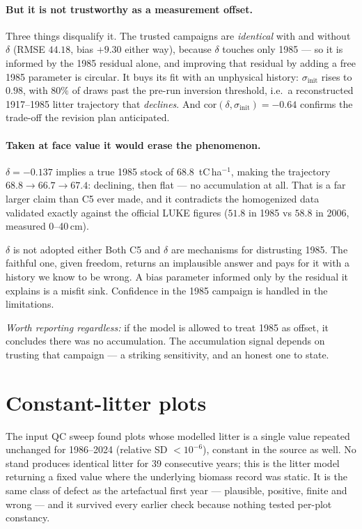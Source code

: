 \documentclass[11pt]{article}
\newcommand{\sinit}{\sigma_{\mathrm{init}}}
\begin{document}
\paragraph{But it is not trustworthy as a measurement offset.} Three things disqualify it.
The trusted campaigns are \emph{identical} with and without $\delta$ (RMSE $44.18$, bias
$+9.30$ either way), because $\delta$ touches only 1985 --- so it is informed by the 1985
residual alone, and improving that residual by adding a free 1985 parameter is circular.
It buys its fit with an unphysical history: $\sinit$ rises to $0.98$, with $80\%$ of draws
past the pre-run inversion threshold, i.e.\ a reconstructed 1917--1985 litter trajectory that
\emph{declines}. And $\mathrm{cor}(\delta, \sinit) = -0.64$ confirms the trade-off the
revision plan anticipated.

\paragraph{Taken at face value it would erase the phenomenon.} $\delta = -0.137$ implies a
true 1985 stock of $68.8$~tC\,ha$^{-1}$, making the trajectory $68.8 \rightarrow 66.7
\rightarrow 67.4$: declining, then flat --- no accumulation at all. That is a far larger claim
than C5 ever made, and it contradicts the homogenized data validated exactly against the
official LUKE figures ($51.8$ in 1985 vs $58.8$ in 2006, measured 0--40\,cm).

\begin{decision}{$\delta$ is not adopted either}
Both C5 and $\delta$ are mechanisms for distrusting 1985. The faithful one, given freedom,
returns an implausible answer and pays for it with a history we know to be wrong. A bias
parameter informed only by the residual it explains is a misfit sink. Confidence in the 1985
campaign is handled in the limitations.

\smallskip
\emph{Worth reporting regardless:} if the model is allowed to treat 1985 as offset, it
concludes there was no accumulation. The accumulation signal depends on trusting that
campaign --- a striking sensitivity, and an honest one to state.
\end{decision}

\section{Constant-litter plots}

The input QC sweep found plots whose modelled litter is a single value repeated unchanged for
1986--2024 (relative SD $<10^{-6}$), constant in the source as well. No stand produces
identical litter for 39 consecutive years; this is the litter model returning a fixed value
where the underlying biomass record was static. It is the same class of defect as the
artefactual first year --- plausible, positive, finite and wrong --- and it survived every
earlier check because nothing tested per-plot constancy.
\end{document}

